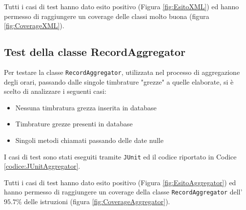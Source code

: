 \lstset{
    caption=Casi JUnit per il test delle funzionalità di gestione del file XML,
    label=codice:JUnitXML,
 }



\noindent
Tutti i casi di test hanno dato esito positivo (Figura \ref{fig:EsitoXML}) ed hanno permesso di raggiungere un coverage delle classi molto buona (figura \ref{fig:CoverageXML}). 
\subsection{Test della classe RecordAggregator}
Per testare la classe \verb|RecordAggregator|, utilizzata nel processo di aggregazione degli orari, passando dalle singole timbrature "grezze" a quelle elaborate, si è scelto di analizzare i seguenti casi:
\begin{itemize}
	\item Nessuna timbratura grezza inserita in database
	\item Timbrature grezze presenti in database
	\item Singoli metodi chiamati passando delle date nulle
\end{itemize}
I casi di test sono stati eseguiti tramite \verb|JUnit| ed il codice riportato in Codice \ref{codice:JUnitAggregator}.
\lstset{
    caption=Casi JUnit per il test della classe RecordAggregator,
    label=codice:JUnitAggregator,
 }



\noindent
Tutti i casi di test hanno dato esito positivo (Figura \ref{fig:EsitoAggregator}) ed hanno permesso di raggiungere un coverage della classe \verb|RecordAggregator| dell'$95.7\%$ delle istruzioni (figura \ref{fig:CoverageAggregator}). 


